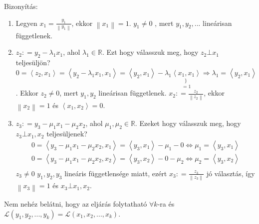 \documentclass[12pt,a4paper]{scrartcl}
\providecommand{\tightlist}{%
  \setlength{\itemsep}{0pt}\setlength{\parskip}{0pt}}
\newenvironment{bizonyitas}{}{}
\begin{document}
\begin{bizonyitas}

Bizonyítás:

\begin{enumerate}
\def\labelenumi{\arabic{enumi}.}
\tightlist
\item
  Legyen \(x_{1} = \frac{y_{1}}{\left\| y_{1} \right\|}\), ekkor
  \(\left\| x_{1} \right\| = 1\). \(y_{1} \neq 0\) , mert
  \(y_{1},y_{2},...\) lineárisan függetlenek.
\item
  \(z_{2}: = y_{2} - \lambda_{1}x_{1}\), ahol
  \(\lambda_{1} \in {\mathbb{R}}\). Ezt hogy válasszuk meg, hogy
  \(z_{2}\bot x_{1}\) teljesüljön?
  \(\left. 0 = \left\langle {z_{2},x_{1}} \right\rangle = \left\langle {y_{2} - \lambda_{1}x_{1},x_{1}} \right\rangle = \left\langle {y_{2},x_{1}} \right\rangle - \lambda_{1}\underset{= 1}{\underset{\}\ }{\left\langle {x_{1},x_{1}} \right\rangle}}\Rightarrow\lambda_{1} = \left\langle {y_{2},x_{1}} \right\rangle \right.\).
  Ekkor \(z_{2} \neq 0\), mert \(y_{1},y_{2}\) lineárisan függetlenek.
  \(x_{2}: = \frac{z_{2}}{\left\| z_{2} \right\|}\), ekkor
  \(\left\| x_{2} \right\| = 1\) és
  \(\left\langle {x_{1},x_{2}} \right\rangle = 0\).
\item
  \(z_{3}: = y_{3} - \mu_{1}x_{1} - \mu_{2}x_{2}\), ahol
  \(\mu_{1},\mu_{2} \in {\mathbb{R}}\). Ezeket hogy válasszuk meg, hogy
  \(z_{3}\bot x_{1},x_{2}\) teljesüljenek? \[\begin{array}{l}
  \left. 0 = \left\langle {y_{3} - \mu_{1}x_{1} - \mu_{2}x_{2},x_{1}} \right\rangle = \left\langle {y_{3},x_{1}} \right\rangle - \mu_{1} - 0\Leftrightarrow\mu_{1} = \left\langle {y_{3},x_{1}} \right\rangle \right. \\
  \left. 0 = \left\langle {y_{3} - \mu_{1}x_{1} - \mu_{2}x_{2},x_{2}} \right\rangle = \left\langle {y_{3},x_{2}} \right\rangle - 0 - \mu_{2}\Leftrightarrow\mu_{2} = \left\langle {y_{3},x_{2}} \right\rangle \right. \\
  \end{array}\] \(z_{3} \neq 0\) \(y_{1},y_{2},y_{3}\) lineáris
  függetlensége miatt, ezért
  \(x_{3}: = \frac{z_{3}}{\left\| z_{3} \right\|}\) jó választás, így
  \(\left\| x_{3} \right\| = 1\) és \(x_{3}\bot x_{1},x_{2}\).
\end{enumerate}

Nem nehéz belátni, hogy az eljárás folytatható \(\forall k\)-ra és
\(\mathcal{L}\left( {y_{1},y_{2},...,y_{k}} \right) = \mathcal{L}\left( {x_{1},x_{2},...,x_{k}} \right)\).

\end{bizonyitas}
\end{document}
